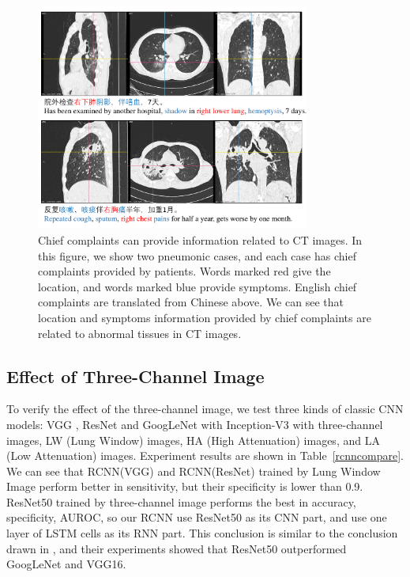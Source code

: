 \documentclass[journal]{IEEEtran}
\begin{document}
\begin{figure}[t]
    \centerline{\includegraphics[width=90mm]{txtpic.pdf}}
    \vspace{-0cm}
    \caption{Chief complaints can provide information related to CT images. In this figure, we show two pneumonic cases, and each case has chief complaints provided by patients. Words marked red give the location, and words marked blue provide symptoms. English chief complaints are translated from Chinese above. We can see that location and symptoms information provided by chief complaints are related to abnormal tissues in CT images.}
    \vspace{-0cm}
    \label{txtpic}
    \end{figure}
    

\subsection{Effect of Three-Channel Image}
\label{effectiveness}
To verify the effect of the three-channel image, we test three kinds of classic CNN models: VGG \cite{simonyan2015very}, ResNet \cite{he2016deep} and GoogLeNet with Inception-V3 \cite{szegedy2016rethinking} with three-channel images, LW (Lung Window) images, HA (High Attenuation) images, and LA (Low Attenuation) images. Experiment results are shown in Table~\ref{rcnncompare}. 
We can see that RCNN(VGG) and RCNN(ResNet) trained by Lung Window Image perform better in sensitivity, but their specificity is lower than 0.9. ResNet50 trained by three-channel image performs the best in accuracy, specificity, AUROC, so our RCNN use ResNet50 as its CNN part, and use one layer of LSTM cells as its RNN part. 
This conclusion is similar to the conclusion drawn in \cite{Wang2017ChestX}, and their experiments showed that ResNet50 outperformed GoogLeNet and VGG16.
\end{document}
